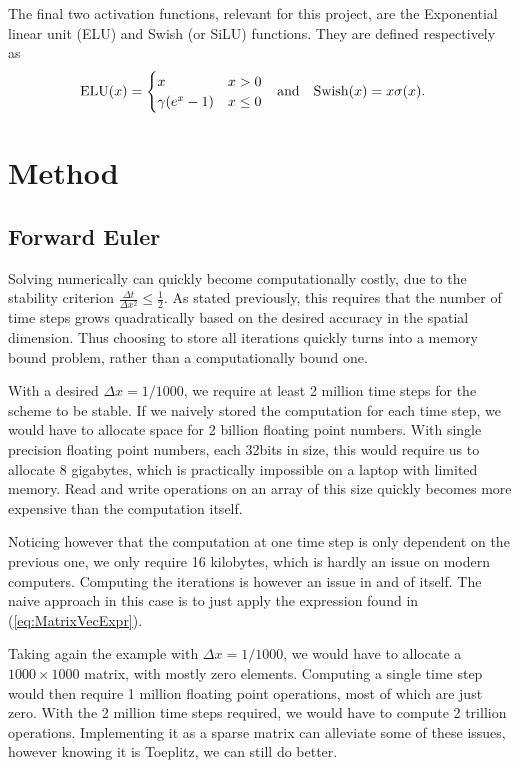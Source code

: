 \documentclass{article}
\theoremstyle{definition}
\begin{document}
The final two activation functions, relevant for this project, are the Exponential linear unit (ELU) and Swish (or SiLU) functions. They are defined respectively as
\begin{align*}
    \operatorname{ELU}(x) &=
    \begin{cases}
        x & x > 0 \\
        \gamma (e^x - 1) & x \leq 0
    \end{cases}
    &\textnormal{and}&&
    \operatorname{Swish}(x) &= x \sigma(x).
\end{align*}

\newpage
\section{Method}
\subsection{Forward Euler}
Solving numerically can quickly become computationally costly, due to the stability criterion $\frac{\Delta t}{\Delta x^2} \leq \frac{1}{2}$. As stated previously, this requires that the number of time steps grows quadratically based on the desired accuracy in the spatial dimension. Thus choosing to store all iterations quickly turns into a memory bound problem, rather than a computationally bound one.

With a desired $\Delta x = 1 / 1000$, we require at least 2 million time steps for the scheme to be stable. If we naively stored the computation for each time step, we would have to allocate space for 2 billion floating point numbers. With single precision floating point numbers, each 32bits in size, this would require us to allocate 8 gigabytes, which is practically impossible on a laptop with limited memory. Read and write operations on an array of this size quickly becomes more expensive than the computation itself.

Noticing however that the computation at one time step is only dependent on the previous one, we only require 16 kilobytes, which is hardly an issue on modern computers. Computing the iterations is however an issue in and of itself. The naive approach in this case is to just apply the expression found in (\ref{eq:MatrixVecExpr}).

Taking again the example with $\Delta x = 1 / 1000$, we would have to allocate a $1000 \times 1000$ matrix, with mostly zero elements. Computing a single time step would then require 1 million floating point operations, most of which are just zero. With the 2 million time steps required, we would have to compute 2 trillion operations. Implementing it as a sparse matrix can alleviate some of these issues, however knowing it is Toeplitz, we can still do better.
\end{document}
